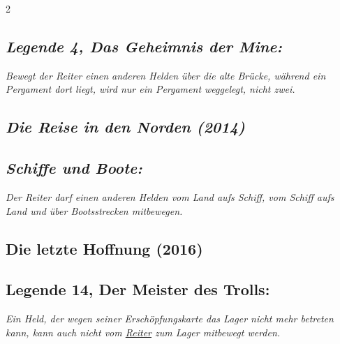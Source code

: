 \documentclass[10pt, a4paper, oneside]{book}
\newcommand{\fan}[1]{\textit{#1}}
\begin{document}
\begin{multicols*}{2}
\begin{bgcolor}
\subsection{\fan{Legende 4, Das Geheimnis der Mine:}}

\fan{Bewegt der Reiter einen anderen Helden über die alte Brücke, während ein Pergament dort liegt, wird nur ein Pergament weggelegt, nicht zwei.}


\end{bgcolor}




\begin{bgcolor}
\section{\fan{Die Reise in den Norden (2014)}}


\subsection{\fan{Schiffe und Boote:}}

\fan{Der Reiter darf einen anderen Helden vom Land aufs Schiff, vom Schiff aufs Land und über Bootsstrecken mitbewegen.}

\end{bgcolor}






\begin{bgcolor}
\section{Die letzte Hoffnung (2016)}





\subsection{Legende 14, Der Meister des Trolls:}

\fan{Ein Held, der wegen seiner Erschöpfungskarte das Lager nicht mehr betreten kann, kann auch nicht vom \hyperref[reiter]{Reiter} zum Lager mitbewegt werden.}







\end{bgcolor}


\begin{bgcolor}[color-ag]

\end{bgcolor}
\end{multicols*}
\end{document}
